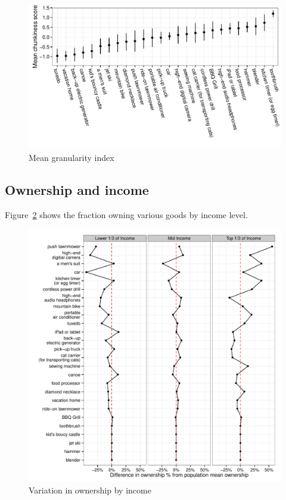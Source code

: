 \documentclass[11pt]{article}
\begin{document}
\begin{figure}
\centering 
\caption{Mean granularity index \label{fig:granularity}}
\begin{minipage}{0.90 \linewidth}
\includegraphics[width = \linewidth]{./plots/granularity.pdf} 
\end{minipage} 
\end{figure} 

\subsection{Ownership and income}

Figure~\ref{fig:ownership_fractions_income} shows the fraction owning various goods by income level.  

\begin{figure}
\centering 
\caption{Variation in ownership by income \label{fig:ownership_fractions_income}}
\begin{minipage}{0.90 \linewidth}
\includegraphics[width = \linewidth]{./plots/ownership_fractions_inc.pdf} 
\end{minipage} 
\end{figure} 
\end{document}

